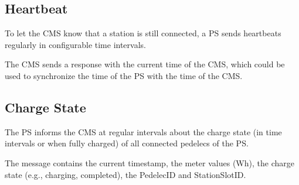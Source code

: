 \subsection{Heartbeat}

To let the \acs{CMS} know that a station is still connected, a \acs{PS} sends heartbeats regularly in configurable time intervals.

The \acs{CMS} sends a response with the current time of the \acs{CMS}, which could be used to synchronize the time of the \acs{PS} with the time of the \acs{CMS}.

\subsection{Charge State}

The \acs{PS} informs the \acs{CMS} at regular intervals about the charge state (in time intervals or when fully charged) of all connected pedelecs of the \acs{PS}.

The message contains the current timestamp, the meter values (Wh), the charge state (e.g., charging, completed), the PedelecID and StationSlotID.